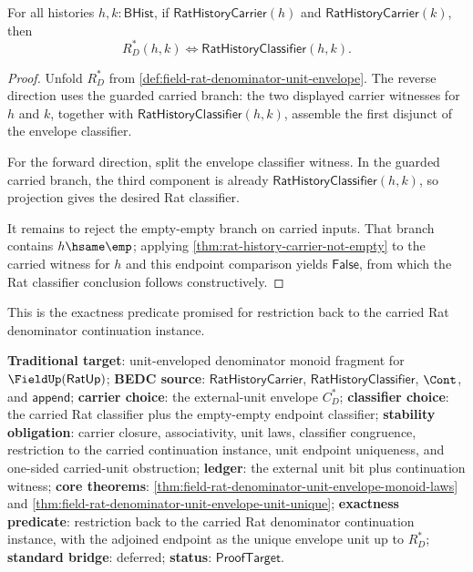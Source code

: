 \begin{theorem}
\label{thm:field-rat-denominator-unit-envelope-carried-classifier-exactness}
For all histories $h,k:\mathsf{BHist}$, if
$\mathsf{RatHistoryCarrier}(h)$ and $\mathsf{RatHistoryCarrier}(k)$, then
$$
R_D^\ast(h,k)\Longleftrightarrow\mathsf{RatHistoryClassifier}(h,k).
$$
\end{theorem}
\begin{proof}
Unfold $R_D^\ast$ from
\autoref{def:field-rat-denominator-unit-envelope}. The reverse direction uses
the guarded carried branch: the two displayed carrier witnesses for $h$ and
$k$, together with $\mathsf{RatHistoryClassifier}(h,k)$, assemble the first
disjunct of the envelope classifier.

For the forward direction, split the envelope classifier witness. In the
guarded carried branch, the third component is already
$\mathsf{RatHistoryClassifier}(h,k)$, so projection gives the desired Rat
classifier.

It remains to reject the empty-empty branch on carried inputs. That branch
contains $h\hsame\emp$; applying
\autoref{thm:rat-history-carrier-not-empty} to the carried witness for $h$ and
this endpoint comparison yields $\mathsf{False}$, from which the Rat classifier
conclusion follows constructively.
\end{proof}

This is the exactness predicate promised for restriction back to the carried
Rat denominator continuation instance.

\textbf{Traditional target}: unit-enveloped denominator monoid fragment for
$\FieldUp(\mathsf{RatUp})$; \textbf{BEDC source}:
$\mathsf{RatHistoryCarrier}$, $\mathsf{RatHistoryClassifier}$, $\Cont$, and
$\mathsf{append}$; \textbf{carrier choice}: the external-unit envelope
$C_D^\ast$; \textbf{classifier choice}: the carried Rat classifier plus the
empty-empty endpoint classifier; \textbf{stability obligation}: carrier closure,
associativity, unit laws, classifier congruence, restriction to the carried
continuation instance, unit endpoint uniqueness, and one-sided carried-unit
obstruction; \textbf{ledger}: the external unit bit plus continuation witness;
\textbf{core theorems}:
\autoref{thm:field-rat-denominator-unit-envelope-monoid-laws}
and
\autoref{thm:field-rat-denominator-unit-envelope-unit-unique};
\textbf{exactness predicate}: restriction back to the carried Rat denominator
continuation instance, with the adjoined endpoint as the unique envelope unit
up to $R_D^\ast$; \textbf{standard bridge}: deferred; \textbf{status}:
$\mathsf{ProofTarget}$.

